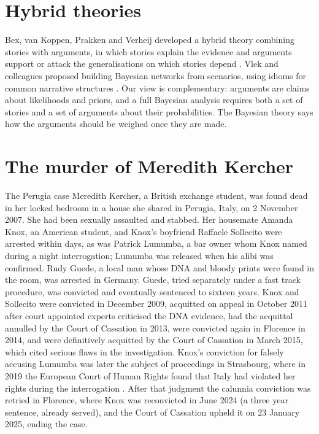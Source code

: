 \section{Hybrid theories}

Bex, van Koppen, Prakken and Verheij developed a hybrid theory combining stories with arguments, in which stories explain the evidence and arguments support or attack the generalisations on which stories depend \citep{bex2010}. Vlek and colleagues proposed building Bayesian networks from scenarios, using idioms for common narrative structures \citep{vlek2014}. Our view is complementary: arguments are claims about likelihoods and priors, and a full Bayesian analysis requires both a set of stories and a set of arguments about their probabilities. The Bayesian theory says how the arguments should be weighed once they are made.

\section{The murder of Meredith Kercher}

\begin{casebox}{The Perugia case}
Meredith Kercher, a British exchange student, was found dead in her locked bedroom in a house she shared in Perugia, Italy, on 2 November 2007. She had been sexually assaulted and stabbed. Her housemate Amanda Knox, an American student, and Knox's boyfriend Raffaele Sollecito were arrested within days, as was Patrick Lumumba, a bar owner whom Knox named during a night interrogation; Lumumba was released when his alibi was confirmed. Rudy Guede, a local man whose DNA and bloody prints were found in the room, was arrested in Germany. Guede, tried separately under a fast track procedure, was convicted and eventually sentenced to sixteen years. Knox and Sollecito were convicted in December 2009, acquitted on appeal in October 2011 after court appointed experts criticised the DNA evidence, had the acquittal annulled by the Court of Cassation in 2013, were convicted again in Florence in 2014, and were definitively acquitted by the Court of Cassation in March 2015, which cited serious flaws in the investigation. Knox's conviction for falsely accusing Lumumba was later the subject of proceedings in Strasbourg, where in 2019 the European Court of Human Rights found that Italy had violated her rights during the interrogation \citep{knox2019}. After that judgment the calunnia conviction was retried in Florence, where Knox was reconvicted in June 2024 (a three year sentence, already served), and the Court of Cassation upheld it on 23 January 2025, ending the case.
\end{casebox}


